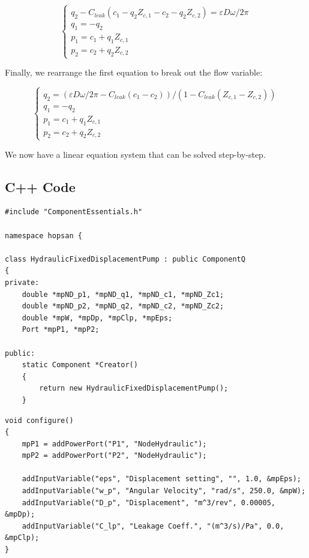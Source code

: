 \documentclass[a4paper,pdftex]{article}
\begin{document}
\begin{equation*}
\begin{cases}
q_{2} - C_{leak}(c_{1} - q_{2}Z_{c,1}-c_{2} - q_{2}Z_{c,2}) = \varepsilon D \omega/2\pi \\
q_{1} = -q_{2}\\
p_{1} = c_{1} + q_{1}Z_{c,1}\\
p_{2} = c_{2} + q_{2}Z_{c,2}
\end{cases}
\end{equation*}

Finally, we rearrange the first equation to break out the flow variable:

\begin{equation*}
\begin{cases}
q_{2} = (\varepsilon D \omega/2\pi - C_{leak}(c_{1} -c_{2})) / (1-C_{leak}(Z_{c,1}-Z_{c,2}))\\
q_{1} = -q_{2}\\
p_{1} = c_{1} + q_{1}Z_{c,1}\\
p_{2} = c_{2} + q_{2}Z_{c,2}
\end{cases}
\end{equation*}

We now have a linear equation system that can be solved step-by-step. 

\subsection*{C++ Code}

\noindent 
\begin{minipage}{\linewidth}
\begin{lstlisting}[basicstyle=\footnotesize\ttfamily]
#include "ComponentEssentials.h"

namespace hopsan {

class HydraulicFixedDisplacementPump : public ComponentQ
{
private:
    double *mpND_p1, *mpND_q1, *mpND_c1, *mpND_Zc1; 
    double *mpND_p2, *mpND_q2, *mpND_c2, *mpND_Zc2;
    double *mpW, *mpDp, *mpClp, *mpEps;
    Port *mpP1, *mpP2;

public:
    static Component *Creator()
    {
        return new HydraulicFixedDisplacementPump();
    }
\end{lstlisting}
\end{minipage}

\noindent 
\begin{minipage}{\linewidth}
\begin{lstlisting}[basicstyle=\footnotesize\ttfamily]
void configure()
{
    mpP1 = addPowerPort("P1", "NodeHydraulic");
    mpP2 = addPowerPort("P2", "NodeHydraulic");

	addInputVariable("eps", "Displacement setting", "", 1.0, &mpEps);
    addInputVariable("w_p", "Angular Velocity", "rad/s", 250.0, &mpW);
    addInputVariable("D_p", "Displacement", "m^3/rev", 0.00005, &mpDp);
    addInputVariable("C_lp", "Leakage Coeff.", "(m^3/s)/Pa", 0.0, &mpClp);
}
\end{lstlisting}
\end{minipage}
\end{document}
